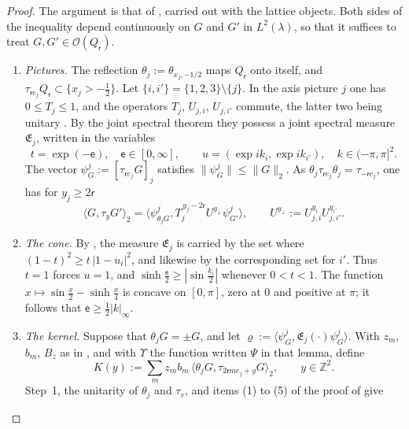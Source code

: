 \documentclass[11pt,letterpaper,reqno]{amsart}
\theoremstyle{definition}
\begin{document}
\begin{proof}
The argument is that of \cite[Lemmas~12.36--12.38, Theorem~12.39]{QEDII}, carried out with the lattice objects.
Both sides of the inequality depend continuously on $G$ and $G'$ in $L^2(\lambda)$, so that it suffices to treat $G,G'\in\mathcal O(Q_{\mathsf r})$.
\begin{enumerate}
\item[1.] \emph{Pictures.}
The reflection $\theta_j:=\theta_{x_j,-1/2}$ maps $Q_{\mathsf r}$ onto itself, and $\tau_{\mathsf re_j}Q_{\mathsf r}\subset\{x_j>-\frac12\}$.
Let $\{i,i'\}=\{1,2,3\}\setminus\{j\}$.
In the axis picture $j$ one has $0\le T_j\le1$, and the operators $T_j$, $U_{j,i}$, $U_{j,i'}$ commute, the latter two being unitary \cite[Lemma~10.9, Definition~10.11]{QEDII}.
By the joint spectral theorem they possess a joint spectral measure $\mathfrak E_j$, written in the variables
\begin{equation*}
t=\exp(-\mathsf e),\quad\mathsf e\in[0,\infty],\qquad u=(\exp ik_i,\exp ik_{i'}),\quad k\in(-\pi,\pi]^2.
\end{equation*}
The vector $\psi^j_G:=[\tau_{\mathsf re_j}G]_j$ satisfies $\|\psi^j_G\|\le\|G\|_2$.
As $\theta_j\tau_{\mathsf re_j}\theta_j=\tau_{-\mathsf re_j}$, one has for $y_j\ge2\mathsf r$
\begin{equation*}
\langle G,\tau_yG'\rangle_2=\bigl\langle\psi^j_{\theta_jG},T_j^{\,y_j-2\mathsf r}U^{y_\perp}\psi^j_{G'}\bigr\rangle,\qquad U^{y_\perp}:=U_{j,i}^{y_i}U_{j,i'}^{y_{i'}}.
\end{equation*}
\item[2.] \emph{The cone.}
By \cite[Theorem~10.12\,(b)]{QEDII}, the measure $\mathfrak E_j$ is carried by the set where $(1-t)^2\ge t\,|1-u_i|^2$, and likewise by the corresponding set for $i'$.
Thus $t=1$ forces $u=1$, and $\sinh\frac{\mathsf e}2\ge|\sin\frac{k_i}2|$ whenever $0<t<1$.
The function $x\mapsto\sin\frac x2-\sinh\frac x4$ is concave on $[0,\pi]$, zero at $0$ and positive at $\pi$; it follows that $\mathsf e\ge\frac12|k|_\infty$.
\item[3.] \emph{The kernel.}
Suppose that $\theta_jG=\pm G$, and let $\varrho:=\langle\psi^j_G,\mathfrak E_j(\cdot)\psi^j_G\rangle$.
With $z_m$, $b_m$, $B_z$ as in \cite[Lemma~12.35]{QEDII}, and with $\Upsilon$ the function written $\Psi$ in that lemma, define
\begin{equation*}
K(y):=\sum_mz_mb_m\,\langle\theta_jG,\tau_{2\mathsf rme_j+y}G\rangle_2,\qquad y\in\mathbb Z^2.
\end{equation*}
Step~1, the unitarity of $\theta_j$ and $\tau_v$, and items (1) to (5) of the proof of \cite[Lemma~12.37]{QEDII} give

\end{enumerate}
\end{proof}
\end{document}
